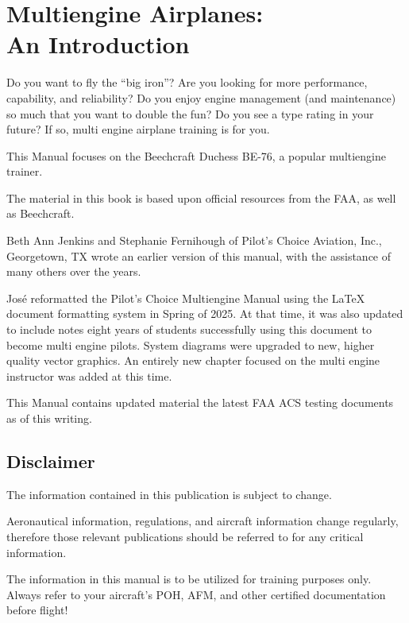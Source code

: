 
\chapter*{Multiengine Airplanes:\\An Introduction}


Do you want to fly the ``big iron''? Are you looking for more performance, capability,
and reliability? Do you enjoy engine management (and maintenance) so much that you want to
double the fun? Do you see a type rating in your future? If so, multi engine airplane training is for you.


This Manual focuses on the Beechcraft Duchess BE-76, a popular multiengine trainer.

The material in this book is based upon official resources from the FAA, as well as Beechcraft.

Beth Ann Jenkins and Stephanie Fernihough of Pilot's Choice Aviation, Inc., Georgetown, TX
wrote an earlier version of this manual, with the assistance of many others over the years.

Jos\'e reformatted the Pilot's Choice Multiengine Manual using the \LaTeX{} document formatting
system in Spring of 2025. At that time, it was also
updated to include notes eight years of students successfully using this document to become multi
engine pilots. System diagrams were upgraded to new, higher quality vector graphics. An entirely
new chapter focused on the multi engine instructor was added at this time.

This Manual
contains updated material the latest FAA ACS testing documents as of this writing.

\section*{Disclaimer}

The information contained in this publication is subject to change.

Aeronautical information, regulations, and aircraft information change regularly, therefore those relevant
publications should be referred to for any critical information.

The information in this manual is to be utilized for training purposes only. Always
refer to your aircraft's POH, AFM, and other certified documentation before flight!

